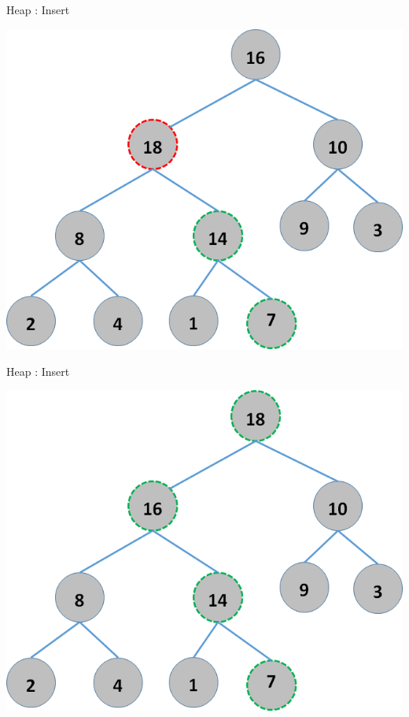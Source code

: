 \documentclass{beamer}
\begin{document}
\begin{frame}{Heap : Insert}
    \begin{center}
        \includegraphics[scale=0.5]{heapInsert4.png}
    \end{center}
\end{frame}


\begin{frame}{Heap : Insert}
    \begin{center}
        \includegraphics[scale=0.5]{heapInsert5.png}
    \end{center}
\end{frame}
\end{document}
